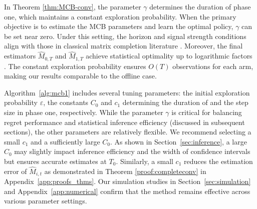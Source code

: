 \documentclass[12pt]{article}
\def\hat{\widehat}
\theoremstyle{plain}
\begin{document}
In Theorem \ref{thm:MCB-conv}, the parameter $\gamma$ determines the duration of phase one, which maintains a constant exploration probability. When the primary objective is to estimate the MCB parameters and learn the optimal policy, $\gamma$ can be set near zero. Under this setting, the horizon and signal strength conditions align with those in classical matrix completion literature \citep{keshavan2010matrix, candes2012exact}. Moreover, the final estimators $\hat M_{0,T}$ and $\hat M_{1,T}$ achieve statistical optimality up to logarithmic factors \citep{koltchinskii2011nuclear, ma2018implicit, cai2023online}. The constant exploration probability ensures $O(T)$ observations for each arm, making our results comparable to the offline case.
 



Algorithm~\ref{alg:mcb1} includes several tuning parameters: the initial exploration probability 
$\varepsilon$, the constants $C_0$ and $c_1$ determining the duration of and the step size in phase one, respectively. While the parameter $\gamma$ is critical for balancing regret performance and statistical inference efficiency (discussed in subsequent sections), the other parameters are relatively flexible. We recommend selecting a small $c_1$  and a sufficiently large $C_0$. As shown in Section~\ref{sec:inference}, a large 
$C_0$ may slightly impact inference efficiency and the width of confidence intervals but ensures accurate estimates at $T_0$. Similarly, a small $c_1$ reduces the estimation error of $\hat M_{i,t}$	as demonstrated in Theorem \ref{proof:completeconv} in Appendix~\ref{app:proofs_thms}. Our simulation studies in Section~\ref{sec:simulation} and Appendix~\ref{app:numerical} confirm that the method remains effective across various parameter settings.
\end{document}
